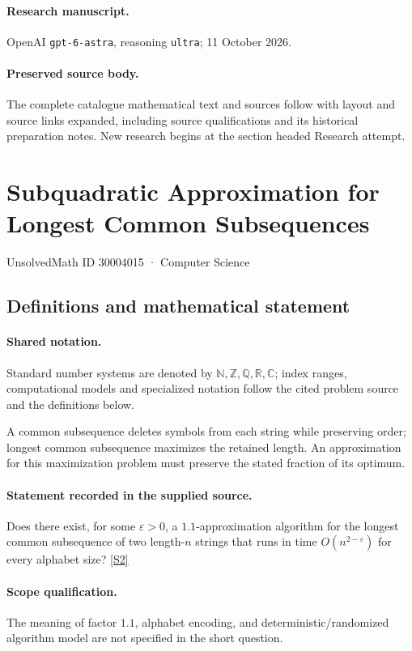 \documentclass[11pt]{article}
\begin{document}
\paragraph{Research manuscript.} OpenAI \texttt{gpt-6-astra}, reasoning \texttt{ultra}; 11 October 2026.
\paragraph{Preserved source body.} The complete catalogue mathematical text and sources follow with layout and source links expanded, including source qualifications and its historical preparation notes. New research begins at the section headed Research attempt.

\section{Subquadratic Approximation for Longest Common Subsequences}\label{30004015}
{\small UnsolvedMath ID 30004015 · Computer Science}
\subsection{Definitions and mathematical statement}

\paragraph{Shared notation.}Standard number systems are denoted by $\mathbb N,\mathbb Z,\mathbb Q,\mathbb R,\mathbb C$; index ranges, computational models and specialized notation follow the cited problem source and the definitions below.


A common subsequence deletes symbols from each string while preserving order; longest common subsequence maximizes the retained length. An approximation for this maximization problem must preserve the stated fraction of its optimum.
\paragraph{Statement recorded in the supplied source.}
Does there exist, for some $\varepsilon>0$, a $1.1$-approximation algorithm for the longest common subsequence of two length-$n$ strings that runs in time $O(n^{2-\varepsilon})$ for every alphabet size? \href{https://doi.org/10.4171/owr/2018/51}{[S2]}
\paragraph{Scope qualification.}
The meaning of factor $1.1$, alphabet encoding, and deterministic/randomized algorithm model are not specified in the short question.
\end{document}
